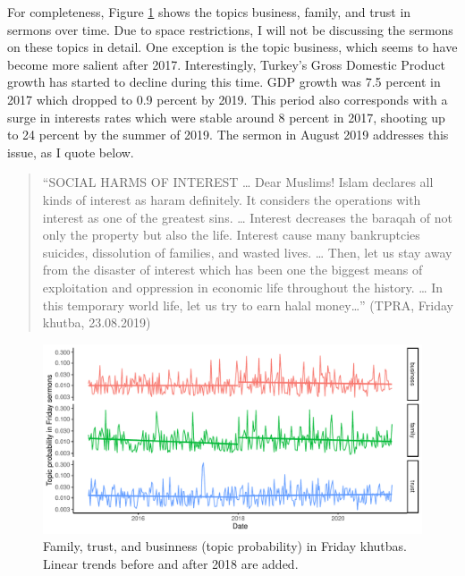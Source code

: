 \documentclass[
  12pt,
]{article}
\begin{document}
For completeness, Figure \ref{fig:fig-5} shows the topics business, family, and trust in sermons over time. Due to space restrictions, I will not be discussing the sermons on these topics in detail. One exception is the topic business, which seems to have become more salient after 2017. Interestingly, Turkey's Gross Domestic Product growth has started to decline during this time. GDP growth was 7.5 percent in 2017 which dropped to 0.9 percent by 2019. This period also corresponds with a surge in interests rates which were stable around 8 percent in 2017, shooting up to 24 percent by the summer of 2019. The sermon in August 2019 addresses this issue, as I quote below.

\begin{quote}
``SOCIAL HARMS OF INTEREST \ldots{} Dear Muslims! Islam declares all kinds of interest as haram definitely. It considers the operations with interest as one of the greatest sins. \ldots{} Interest decreases the baraqah of not only the property but also the life. Interest cause many bankruptcies suicides, dissolution of families, and wasted lives. \ldots{} Then, let us stay away from the disaster of interest which has been one the biggest means of exploitation and oppression in economic life throughout the history. \ldots{} In this temporary world life, let us try to earn
halal money\ldots{}'' (TPRA, Friday khutba, 23.08.2019)
\end{quote}

\begin{figure}

{\centering \includegraphics{Khutbas_files/figure-latex/fig-5-1} 

}

\caption{Family, trust, and businness (topic probability) in Friday khutbas. Linear trends before and after 2018 are added.}\label{fig:fig-5}
\end{figure}
\end{document}
